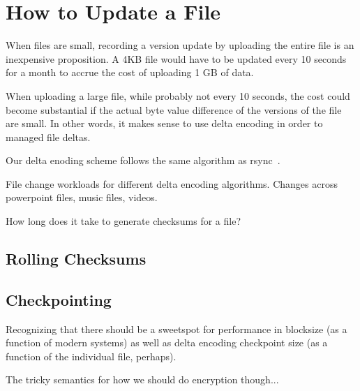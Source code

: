 \section{How to Update a File}

When files are small, recording a version update by uploading the
entire file is an inexpensive proposition. A 4KB file would have to be
updated every 10 seconds for a month to accrue the cost of uploading 1
GB of data.

When uploading a large file, while probably not every 10 seconds, the
cost could become substantial if the actual byte value difference of
the versions of the file are small. In other words, it makes sense to
use delta encoding in order to managed file deltas.

Our delta enoding scheme follows the same algorithm as
rsync~\cite{rsync}. 

File change workloads for different delta encoding algorithms. Changes
across powerpoint files, music files, videos.

How long does it take to generate checksums for a file? 

\subsection{Rolling Checksums}


\subsection{Checkpointing}

Recognizing that there should be a sweetspot for performance in
blocksize (as a function of modern systems) as well as delta encoding
checkpoint size (as a function of the individual file, perhaps).

The tricky semantics for how we should do encryption though...
